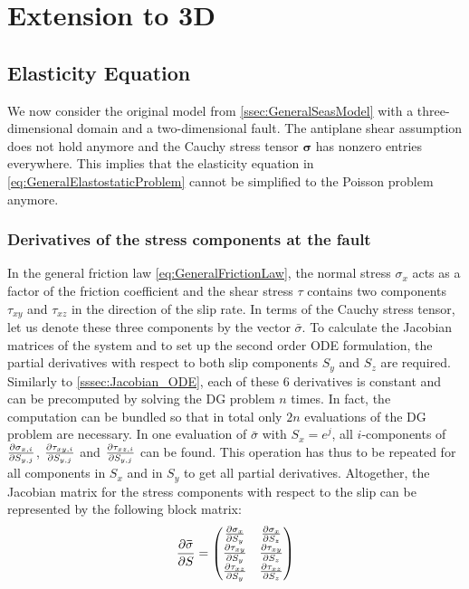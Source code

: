 \chapter{Extension to 3D}
\label{chap:Extensions3D}
\section{Elasticity Equation}
We now consider the original model from \autoref{ssec:GeneralSeasModel} with a three-dimensional domain and a two-dimensional fault. The antiplane shear assumption does not hold anymore and the Cauchy stress tensor $\mathbf{\sigma}$ has nonzero entries everywhere. This implies that the elasticity equation in \autoref{eq:GeneralElastostaticProblem} cannot be simplified to the Poisson problem anymore. \\

\subsection{Derivatives of the stress components at the fault}
In the general friction law \ref{eq:GeneralFrictionLaw}, the normal stress $\sigma_x$ acts as a factor of the friction coefficient and the shear stress $\tau$ contains two components $\tau_{xy}$ and $\tau_{xz}$ in the direction of the slip rate. In terms of the Cauchy stress tensor, let us denote these three components by the vector $\bar{\sigma}$. To calculate the Jacobian matrices of the system and to set up the second order ODE formulation, the partial derivatives with respect to both slip components $S_y$ and $S_z$ are required. \\
Similarly to \autoref{sssec:Jacobian_ODE}, each of these 6 derivatives is constant and can be precomputed by solving the DG problem $n$ times. In fact, the computation can be bundled so that in total only $2n$ evaluations of the DG problem are necessary. In one evaluation of $\bar{\sigma}$ with $S_x = e^j$, all $i$-components of $\pdv{\sigma_{x,i}}{S_{y,j}}$, $\pdv{\tau_{xy,i}}{S_{y,j}}$ and $\pdv{\tau_{xz,i}}{S_{y,j}}$ can be found. This operation has thus to be repeated for all components in $S_x$ and in $S_y$ to get all partial derivatives. Altogether, the Jacobian matrix for the stress components with respect to the slip can be represented by the following block matrix:
\begin{equation}
	\label{eq:stressComponentsJacobian3D}
	\pdv{\mathbf{\bar{\sigma}}}{S} = \begin{pmatrix}
		\pdv{\sigma_x}{S_y} & \pdv{\sigma_x}{S_z}\\ 
		\pdv{\tau_{xy}}{S_y}  & \pdv{\tau_{xy}}{S_z} \\ 
		\pdv{\tau_{xz}}{S_y}  & \pdv{\tau_{xz}}{S_z}		
	\end{pmatrix}
\end{equation}

